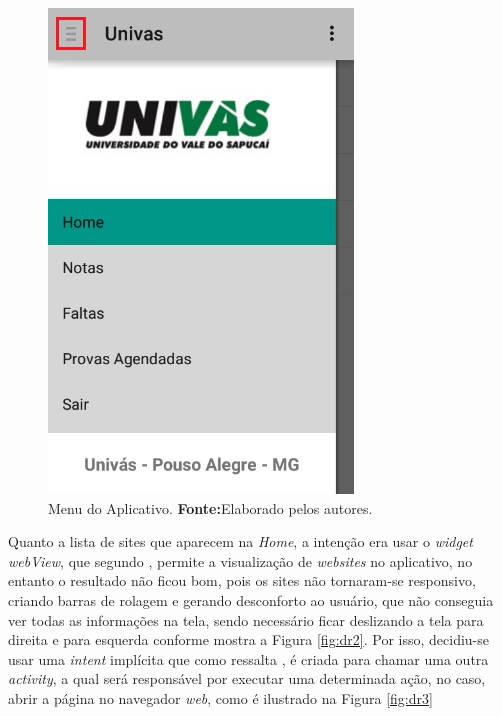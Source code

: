 \begin{figure}[h!]
	\centerline{\includegraphics[scale=0.5]{./imagens/3_discussao_resultados/dr1.png}}
	\caption[Menu do Aplicativo]{Menu do Aplicativo.
		\textbf{Fonte:}Elaborado pelos autores.}
	\label{fig:dr1}
\end{figure}
\pagebreak

\par Quanto a lista de sites que aparecem na \textit{Home}, a intenção era usar
o \textit{widget webView}, que segundo , permite a
visualização de \textit{websites} no aplicativo, no entanto o resultado não
ficou bom, pois os sites não tornaram-se responsivo, criando barras de rolagem
e gerando desconforto ao usuário, que não conseguia ver todas as informações na
tela, sendo necessário ficar deslizando a tela para direita e para esquerda
conforme mostra a Figura \ref{fig:dr2}. Por isso, decidiu-se usar uma
\textit{intent} implícita que como ressalta , é criada
para chamar uma outra \textit{activity}, a qual será responsável por executar
uma determinada ação, no caso, abrir a página no navegador \textit{web}, como é
ilustrado na Figura \ref{fig:dr3}

